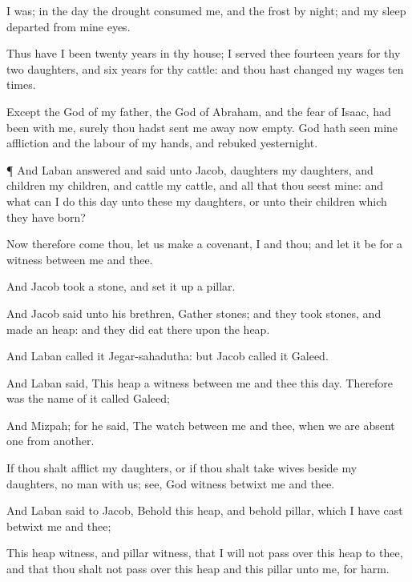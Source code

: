 { I was; in the
day the
drought
consumed me, and the
frost by
night; and my
sleep
departed from mine
eyes.

Thus have I been
twenty
years in thy
house; I served
thee
fourteen
years for thy
two
daughters, and
six
years for thy
cattle: and thou hast
changed my
wages
ten
times.

Except the
God of my
father, the
God of
Abraham, and the
fear of
Isaac, had been with me, surely thou hadst sent me
away now
empty.
God hath
seen mine
affliction and the
labour of my
hands, and
rebuked
{}
yesternight.


\par }{\PP {}¶ And
Laban
answered and
said unto
Jacob,
{}
daughters
{} my
daughters, and
{}
children
{} my
children, and
{}
cattle
{} my
cattle, and all that thou
seest
{} mine: and what can I
do this
day unto these my
daughters,
or unto their
children which they have
born?

Now therefore come
thou, let us
make a
covenant, I and thou; and let it be for a
witness between me and thee.

And
Jacob
took a
stone, and set it
up
{} a
pillar.

And
Jacob
said unto his
brethren,
Gather
stones; and they
took
stones, and
made an
heap: and they did
eat there upon the
heap.

And
Laban
called it
Jegar-sahadutha: but
Jacob
called it
Galeed.

And
Laban
said, This
heap
{} a
witness between me and thee this
day. Therefore was the
name of it
called
Galeed;

And
Mizpah;
for he
said, The
{}
watch between me and thee, when we are
absent
one from
another.

If thou shalt
afflict my
daughters, or if thou shalt
take
{}
wives
beside my
daughters, no
man
{} with us;
see,
God
{}
witness betwixt me and thee.

And
Laban
said to
Jacob, Behold this
heap, and behold
{}
pillar, which I have
cast betwixt me and thee;

This
heap
{}
witness, and
{}
pillar
{}
witness, that I will not pass
over this
heap to thee, and that thou shalt not pass
over this
heap and this
pillar unto me, for
harm.

}
